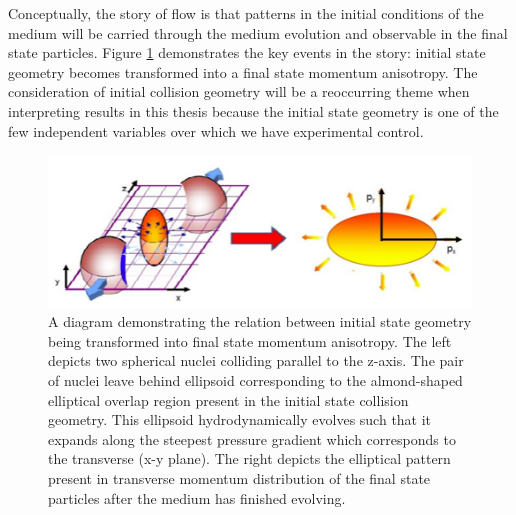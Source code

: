 Conceptually, the story of flow is that patterns in the initial conditions of the medium will be carried through the medium evolution and observable in the final state particles. Figure \ref{fig:standard_flow_diagram} demonstrates the key events in the story: initial state geometry becomes transformed into a final state momentum anisotropy. The consideration of initial collision geometry will be a reoccurring theme when interpreting results in this thesis because the initial state geometry is one of the few independent variables over which we have experimental control.

\begin{figure}[!ht]
\begin{center}
\includegraphics[width=0.55\linewidth]{figs/elliptical_flow_cartoon.png}
\caption{A diagram demonstrating the relation between initial state geometry being transformed into final state momentum anisotropy. The left depicts two spherical nuclei colliding parallel to the z-axis. The pair of nuclei leave behind ellipsoid corresponding to the almond-shaped elliptical overlap region present in the initial state collision geometry. This ellipsoid hydrodynamically evolves such that it expands along the steepest pressure gradient which corresponds to the transverse (x-y plane). The right depicts the elliptical pattern present in transverse momentum distribution of the final state particles after the medium has finished evolving.}
\label{fig:standard_flow_diagram}
\end{center}
\end{figure}

